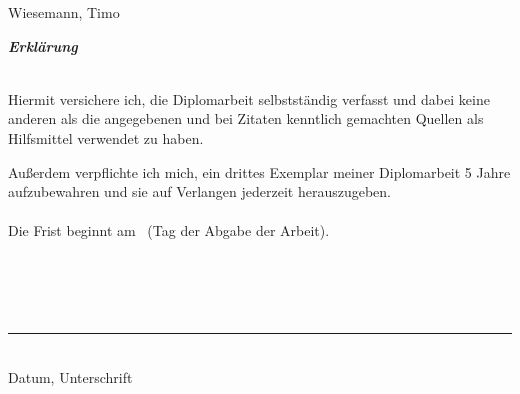 \newpage
\thispagestyle{empty}
Wiesemann, Timo \\

\begin{center}
  \textit{\textbf{Erklärung}}
\end{center}

\hspace*{60mm}\\

Hiermit versichere ich, die Diplomarbeit selbstständig verfasst und dabei keine anderen als die angegebenen und bei Zitaten kenntlich gemachten Quellen als Hilfsmittel verwendet zu haben.
\bigskip

Außerdem verpflichte ich mich, ein drittes Exemplar meiner Diplomarbeit 5 Jahre aufzubewahren und sie auf Verlangen jederzeit herauszugeben.\\
\\
Die Frist beginnt am \hrulefill\ (Tag der Abgabe der Arbeit).\\
\\
\\
\\
\\
\begin{minipage}{25cm}
  \begin{flushright}
    \begin{center}
      \rule{7cm}{0.2mm}\\
      Datum, Unterschrift
      \end{center}
  \end{flushright}
\end{minipage}
\newpage

